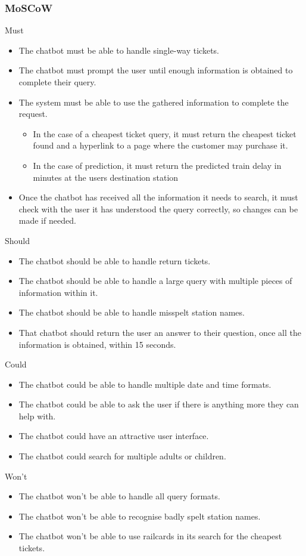 \documentclass[11pt]{article}
\begin{document}
	\subsubsection{MoSCoW}
	Must
	\begin{itemize}	
		\item The chatbot must be able to handle single-way tickets.		
		\item The chatbot must prompt the user until enough information is obtained to complete their query.
		\item The system must be able to use the gathered information to complete the request. 
		\begin{itemize}
			\item In the case of a cheapest ticket query, it must return the cheapest ticket found and a hyperlink to a page where the customer may purchase it.
			\item In the case of prediction, it must return the predicted train delay in minutes at the users destination station			
		\end{itemize}		
		\item Once the chatbot has received all the information it needs to search, it must check with the user it has understood the query correctly, so changes can be made if needed.
	\end{itemize}
	Should 
	\begin{itemize}
		\item The chatbot should be able to handle return tickets.		
		\item The chatbot should be able to handle a large query with multiple pieces of information within it.
		\item The chatbot should be able to handle misspelt station names.
		\item That chatbot should return the user an answer to their question, once all the information is obtained, within 15 seconds.		
	\end{itemize}
	Could
	\begin{itemize}
		\item The chatbot could be able to handle multiple date and time formats.		
		\item The chatbot could be able to ask the user if there is anything more they can help with.
		\item The chatbot could have an attractive user interface.
		\item The chatbot could search for multiple adults or children.				
	\end{itemize}
	Won't
	\begin{itemize}
		\item The chatbot won't be able to handle all query formats.
		\item The chatbot won't be able to recognise badly spelt station names.
		\item The chatbot won’t be able to use railcards in its search for the cheapest tickets.		
	\end{itemize}	 
	
\end{document}
